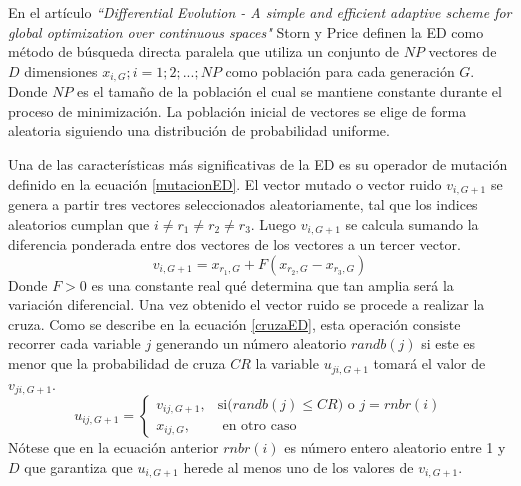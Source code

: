 En el artículo \textit{``Differential Evolution - A simple and efficient adaptive scheme for global optimization over continuous spaces"} Storn y Price definen la ED como método de búsqueda directa paralela que utiliza un conjunto de $NP$ vectores  de $D$ dimensiones $x_{i,G}; i = 1; 2; ...; NP$  como población para cada generación $G$. Donde $NP$ es el tamaño de la población el cual se mantiene constante durante el proceso de minimización. La población inicial de vectores se elige de forma aleatoria siguiendo una distribución de probabilidad uniforme.

Una de las características más significativas de la ED es su operador de mutación definido en la ecuación \ref{mutacionED}. El vector mutado o vector ruido $v_{i,G+1}$ se genera a partir tres vectores seleccionados aleatoriamente, tal que los indices aleatorios cumplan que $ i \neq r_1 \neq r_2 \neq r_3$. Luego $v_{i,G+1}$ se calcula sumando la diferencia ponderada entre dos vectores de los vectores a un tercer vector.
\begin{equation} \label{mutacionED}
v_{i,G+1} = x_{r_1,G} + F (x_{r_2 ,G}-x_{r_3,G})
\end{equation}
Donde $F >0$ es una constante real qué determina que tan amplia será la variación diferencial. Una vez obtenido el vector ruido se procede a realizar la cruza. Como se describe en la ecuación \ref{cruzaED}, esta operación consiste recorrer cada variable $j$  generando un número aleatorio $randb(j)$  si este es menor que la probabilidad de cruza $CR$ la variable $u_{ji,G+1}$ tomará el valor de  $v_{ji,G+1}$. 
\begin{equation} \label{cruzaED}
  u_{ij,G+1} = 
\begin{cases}
    v_{ij,G+1},& \text{si($randb(j) \leq CR$) o $j=rnbr(i)$}\\
    x_{ij,G},& \text{ en otro caso}
\end{cases}
\end{equation}
Nótese que en la ecuación anterior $rnbr(i)$ es número entero aleatorio entre 1 y $D$ que garantiza que  $u_{i,G+1}$ herede al menos uno de los valores de $v_{i,G+1}$. 

